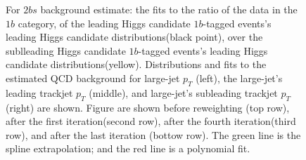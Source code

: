 \begin{figure}[htbp!]
\begin{center}
\caption{For $2bs$ background estimate: the fits to the ratio of the data in the $1b$ category, of the leading Higgs candidate $1b$-tagged events's leading Higgs candidate distributions(black point), over the sublleading Higgs candidate $1b$-tagged events's leading Higgs candidate distributions(yellow). Distributions and fits to the estimated QCD background for large-\R jet $p_{T}$ (left),  the large-\R jet's leading trackjet $p_T$ (middle), and large-\R jet's subleading trackjet $p_T$ (right) are shown.  Figure are shown before reweighting (top row), after the first iteration(second row), after the fourth iteration(third row), and after the last iteration (bottow row). The green line is the spline extrapolation; and the red line is a polynomial fit.}
\label{fig:rw-2bs-subl}
\end{center}
\end{figure}

